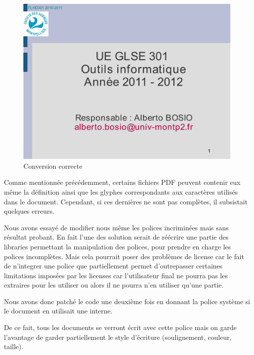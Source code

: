  \begin{figure}[h]
        \begin{center}
            \includegraphics[scale=0.2]{images/GLSE301_2011-2012_seance_11_goodConv.jpg} 
        \end{center}

        \caption{Conversion correcte}
        \label{Conversion correcte}
    \end{figure}
Comme mentionnée précédemment, certains fichiers PDF peuvent contenir eux 
même la définition ainsi que les glyphes correspondants aux caractères utilisés dans 
le document. Cependant, si ces dernières ne sont pas complètes, il subsistait
quelques erreurs.

Nous avons essayé de modifier nous même les polices incriminées mais 
sans résultat probant. En fait l'une des solution serait de réécrire une partie des
libraries permettant la manipulation des polices, pour prendre en charge les polices 
incomplètes. Mais cela pourrait poser des problèmes de license car le fait de n'integrer une
police que partiellement permet d'outrepasser certaines limitations imposées par les licenses car 
l'utilisateur final ne pourra pas les extraires pour les utiliser ou alors il ne pourra n'en utiliser qu'une
partie.

 Nous avons donc patché le code une deuxième fois 
en donnant la police système si le document en utilisait une interne.

De ce fait, tous les documents se verront écrit avec cette police mais 
on garde l'avantage de garder partiellement le style d'écriture 
(soulignement, couleur, taille).


